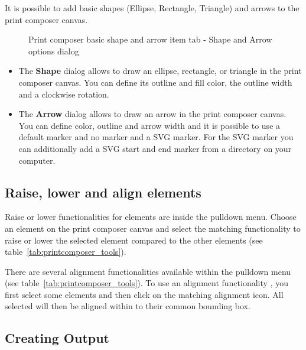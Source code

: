 It is possible to add basic shapes (Ellipse, Rectangle, Triangle) and arrows
to the print composer canvas. 

\begin{figure}[ht]
\centering
\caption{Print composer basic shape and arrow item tab - Shape and Arrow
options dialog \nixcaption}\label{fig:shapearrow}
\goodgap
{}
\end{figure}

\begin{itemize}
\item The \textbf{Shape} dialog allows to draw an ellipse, rectangle, or
triangle in the print composer canvas. You can define its outline and fill
color, the outline width and a clockwise rotation.
\item The \textbf{Arrow} dialog allows to draw an arrow in the print composer
canvas. You can define color, outline and arrow width and it is possible to
use a default marker and no marker and a SVG marker. For the SVG marker you
can additionally add a SVG start and end marker from a directory on your
computer.
\end{itemize}

\subsection{Raise, lower and align elements}

Raise or lower functionalities for elements are inside the
 pulldown menu. Choose an
element on the print composer canvas and select the matching functionality to
raise or lower the selected element compared to the other elements (see
table~\ref{tab:printcomposer_tools}). 

There are several alignment functionalities available within the
 pulldown menu (see
table~\ref{tab:printcomposer_tools}). To use an alignment functionality , you
first select some elements and then click on the matching alignment icon. All
selected will then be aligned within to their common bounding box.       

\subsection{Creating Output}

